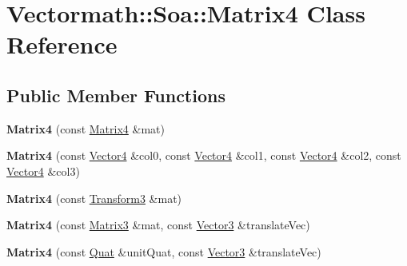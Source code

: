 \hypertarget{classVectormath_1_1Soa_1_1Matrix4}{\section{Vectormath\-:\-:Soa\-:\-:Matrix4 Class Reference}
\label{classVectormath_1_1Soa_1_1Matrix4}
}
\subsection*{Public Member Functions}
\begin{DoxyCompactItemize}
\item 
\hypertarget{classVectormath_1_1Soa_1_1Matrix4_ae1130c2a12f99c3ff5800665ea47e661}{{\bfseries Matrix4} (const \hyperlink{classVectormath_1_1Soa_1_1Matrix4}{Matrix4} \&mat)}\label{classVectormath_1_1Soa_1_1Matrix4_ae1130c2a12f99c3ff5800665ea47e661}

\item 
\hypertarget{classVectormath_1_1Soa_1_1Matrix4_a7bef818cd4f69e0c2100b380b071babc}{{\bfseries Matrix4} (const \hyperlink{classVectormath_1_1Soa_1_1Vector4}{Vector4} \&col0, const \hyperlink{classVectormath_1_1Soa_1_1Vector4}{Vector4} \&col1, const \hyperlink{classVectormath_1_1Soa_1_1Vector4}{Vector4} \&col2, const \hyperlink{classVectormath_1_1Soa_1_1Vector4}{Vector4} \&col3)}\label{classVectormath_1_1Soa_1_1Matrix4_a7bef818cd4f69e0c2100b380b071babc}

\item 
\hypertarget{classVectormath_1_1Soa_1_1Matrix4_a0d8bffb261541bba7711dc4c38b782ad}{{\bfseries Matrix4} (const \hyperlink{classVectormath_1_1Soa_1_1Transform3}{Transform3} \&mat)}\label{classVectormath_1_1Soa_1_1Matrix4_a0d8bffb261541bba7711dc4c38b782ad}

\item 
\hypertarget{classVectormath_1_1Soa_1_1Matrix4_a0abd8564e08b2960e0be1274b0eab06c}{{\bfseries Matrix4} (const \hyperlink{classVectormath_1_1Soa_1_1Matrix3}{Matrix3} \&mat, const \hyperlink{classVectormath_1_1Soa_1_1Vector3}{Vector3} \&translate\-Vec)}\label{classVectormath_1_1Soa_1_1Matrix4_a0abd8564e08b2960e0be1274b0eab06c}

\item 
\hypertarget{classVectormath_1_1Soa_1_1Matrix4_a8410f058e71915d4d0d97c0e86f2d4c6}{{\bfseries Matrix4} (const \hyperlink{classVectormath_1_1Soa_1_1Quat}{Quat} \&unit\-Quat, const \hyperlink{classVectormath_1_1Soa_1_1Vector3}{Vector3} \&translate\-Vec)}\label{classVectormath_1_1Soa_1_1Matrix4_a8410f058e71915d4d0d97c0e86f2d4c6}


\end{DoxyCompactItemize}

